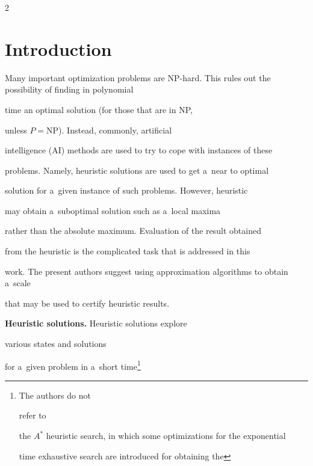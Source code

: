       \begin{multicols}{2}





                  \label{st\stat}





\section{Introduction}





\noindent


Many important optimization problems are NP-hard. This rules out the possibility of finding in polynomial


time an optimal solution (for those that are in NP,


unless $P=\mathrm{NP}$). Instead, commonly, artificial


intelligence (AI) methods are used to try to cope with instances of these


problems. Namely, heuristic solutions are used to get a~near to optimal


solution for a~given instance of such problems. However, heuristic


may obtain a~suboptimal solution such as a~local maxima


rather than the absolute maximum. Evaluation of the result obtained


from the heuristic is the complicated task that is addressed in this


work. The present authors suggest using approximation algorithms to obtain a~scale


that may be used to certify heuristic results.





\noindent


\textbf{Heuristic solutions.} Heuristic solutions explore


various states and solutions


for a~given problem in a~short time\footnote[2]{The authors do not


refer to


the $A^*$ heuristic search, in which some optimizations for the exponential


time exhaustive search are introduced for obtaining the


}
\end{multicols}

